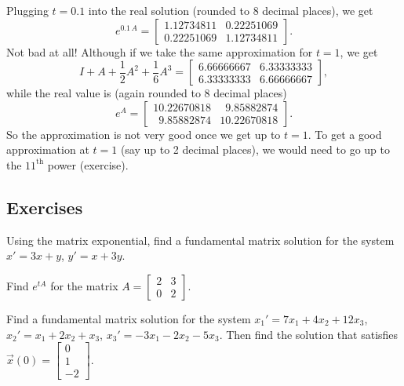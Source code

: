 Plugging $t=0.1$ into the real solution (rounded to 8 decimal places), we get
\begin{equation*}
e^{0.1\,A} = 
\begin{bmatrix}
1.12734811 & 0.22251069 \\
0.22251069 & 1.12734811
\end{bmatrix} .
\end{equation*}
Not bad at all!  Although if we take the same approximation for $t=1$,
we get
\begin{equation*}
I + A + \frac{1}{2}A^2 + \frac{1}{6}A^3
=
\begin{bmatrix}
6.66666667 & 6.33333333 \\
6.33333333 & 6.66666667
\end{bmatrix} ,
\end{equation*}
while the real value is (again rounded to 8 decimal places)
\begin{equation*}
e^{A} =
\begin{bmatrix}
10.22670818           & \phantom{0}9.85882874 \\
\phantom{0}9.85882874 & 10.22670818
\end{bmatrix} .
\end{equation*}
So the approximation is not very good once we get up to $t=1$.  To get a good
approximation at $t=1$ (say up to 2 decimal places), we would need to go up to
the ${11}^{\text{th}}$ power (exercise).

\subsection{Exercises}

\begin{exercise}
Using the matrix exponential,
find a fundamental matrix solution for the system
$x' = 3x+y$, $y' = x+3y$.
\end{exercise}

\begin{exercise}
Find $e^{tA}$ for the matrix $A =
\left[ \begin{smallmatrix}
2 & 3 \\
0 & 2
\end{smallmatrix} \right]$.
\end{exercise}

\begin{exercise}
Find a fundamental matrix solution for the system
$x_1' = 7x_1+4x_2+ 12x_3$,
$x_2' = x_1+2x_2+x_3$,
$x_3' = -3x_1-2x_2- 5x_3$.  Then find the solution that
satisfies $\vec{x}(0) = 
\left[ \begin{smallmatrix} 0 \\ 1 \\ -2 \end{smallmatrix} \right]$.
\end{exercise}


